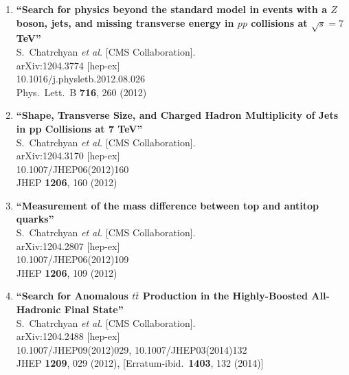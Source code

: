 \documentclass{article}
\begin{document}
\begin{enumerate}
\item%
{\bf ``Search for physics beyond the standard model in events with a $Z$ boson, jets, and missing transverse energy in $pp$ collisions at $\sqrt{s}=7$ TeV''}
  \\{}S.~Chatrchyan {\it et al.}  [CMS Collaboration].
  \\{}arXiv:1204.3774 [hep-ex]
    \\{}10.1016/j.physletb.2012.08.026
\\{}Phys.\ Lett.\ B {\bf 716}, 260 (2012) %


\item%
{\bf ``Shape, Transverse Size, and Charged Hadron Multiplicity of Jets in pp Collisions at 7 TeV''}
  \\{}S.~Chatrchyan {\it et al.}  [CMS Collaboration].
  \\{}arXiv:1204.3170 [hep-ex]
    \\{}10.1007/JHEP06(2012)160
\\{}JHEP {\bf 1206}, 160 (2012) %


\item%
{\bf ``Measurement of the mass difference between top and antitop quarks''}
  \\{}S.~Chatrchyan {\it et al.}  [CMS Collaboration].
  \\{}arXiv:1204.2807 [hep-ex]
    \\{}10.1007/JHEP06(2012)109
\\{}JHEP {\bf 1206}, 109 (2012) %


\item%
{\bf ``Search for Anomalous $t\bar{t}$ Production in the Highly-Boosted All-Hadronic Final State''}
  \\{}S.~Chatrchyan {\it et al.}  [CMS Collaboration].
  \\{}arXiv:1204.2488 [hep-ex]
    \\{}10.1007/JHEP09(2012)029, 10.1007/JHEP03(2014)132
\\{}JHEP {\bf 1209}, 029 (2012), [Erratum-ibid.\  {\bf 1403}, 132 (2014)] %



\end{enumerate}
\end{document}
